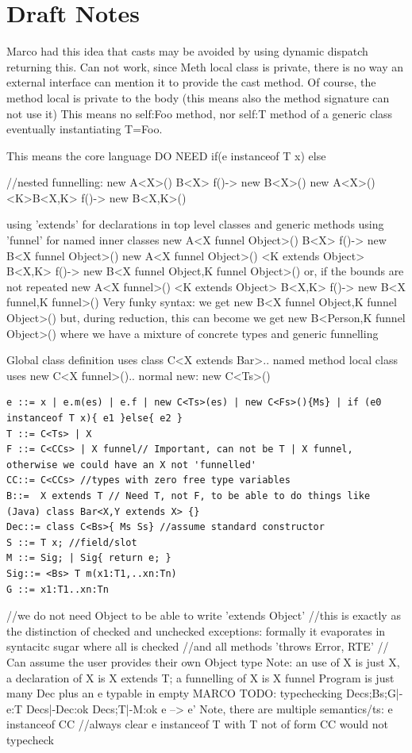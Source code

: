 \section{Draft Notes}

Marco had this idea that casts may be avoided by using dynamic dispatch returning this.
Can not work, since Meth local class is private, there is no way an external interface can mention it to provide the cast method.
Of course, the method local is private to the body (this means also the method signature can not use it)
This means no self:Foo method, nor self:T method of a generic class eventually instantiating T=Foo.

This means the core language DO NEED if(e instanceof T x){} else {}

//nested funnelling:
  new A<X>(){ B<X> f()-> new B<X>(){} }
  new A<X>(){ <K>B<X,K> f()-> new B<X,K>(){} }

using 'extends' for declarations in top level classes and generic methods
using 'funnel' for named inner classes
  new A<X funnel Object>(){ B<X> f()-> new B<X funnel Object>(){} }
  new A<X funnel Object>(){ <K extends Object> B<X,K> f()-> new B<X funnel Object,K funnel Object>(){} }
  or, if the bounds are not repeated
  new A<X funnel>(){ <K extends Object> B<X,K> f()-> new B<X funnel,K funnel>(){} }
Very funky syntax:
we get new B<X funnel Object,K funnel Object>(){}
but, during reduction, this can become 
we get new B<Person,K funnel Object>(){}
where we have a mixture of concrete types and generic funnelling

Global class definition uses class C<X extends Bar>{..}
named method local class uses new C<X funnel>(){..}
normal new: new C<Ts>()

\begin{verbatim}
e ::= x | e.m(es) | e.f | new C<Ts>(es) | new C<Fs>(){Ms} | if (e0 instanceof T x){ e1 }else{ e2 }
T ::= C<Ts> | X
F ::= C<CCs> | X funnel// Important, can not be T | X funnel, otherwise we could have an X not 'funnelled'
CC::= C<CCs> //types with zero free type variables
B::=  X extends T // Need T, not F, to be able to do things like (Java) class Bar<X,Y extends X> {}
Dec::= class C<Bs>{ Ms Ss} //assume standard constructor
S ::= T x; //field/slot
M ::= Sig; | Sig{ return e; }
Sig::= <Bs> T m(x1:T1,..xn:Tn)
G ::= x1:T1..xn:Tn
\end{verbatim}
//we do not need Object to be able to write 'extends Object'
//this is exactly as the distinction of checked and unchecked exceptions: formally it evaporates in syntacitc sugar where all is checked
//and all methods 'throws Error, RTE'
// Can assume the user provides their own Object type
Note: an use of X is just X, a declaration of X is X extends T; a funnelling of X is X funnel
Program is just many Dec plus an e typable in empty
MARCO TODO: 
  typechecking
    Decs;Bs;G|-e:T
    Decs|-Dec:ok
    Decs;T|-M:ok
    e --> e'
Note, there are multiple semantics/ts:
  e instanceof CC //always clear
  e instanceof T with T not of form CC would not typecheck


